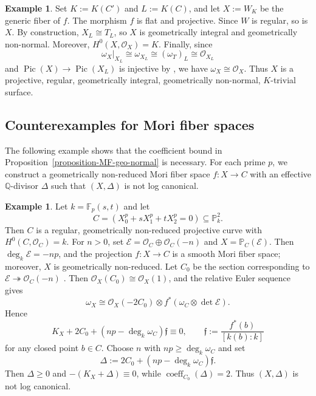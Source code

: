 \documentclass[reqno,oneside]{amsart}
\theoremstyle{definition}
\newtheorem{example}[theorem]{Example}
\theoremstyle{plain}
\numberwithin{equation}{section}
\newcommand\coeff{\operatorname{coeff}}
\begin{document}
\begin{example}
  Set $K:=K(C')$ and $L:=K(C)$, and let $X:=W_K$ be the generic fiber of $f$.
  The morphism $f$ is flat and projective. Since $W$ is regular, so is $X$.
  By construction, $X_L\cong T_L$, so $X$ is geometrically integral and geometrically non-normal.
  Moreover, $H^0(X,\mathcal O_X)=K$.
  Finally, since \[
    \omega_X|_{X_L}\cong\omega_{X_L}\cong(\omega_T)_L\cong\mathcal O_{X_L}
  \]
  and $\operatorname{Pic}(X)\to\operatorname{Pic}(X_L)$ is injective by \cite[\href{https://stacks.math.columbia.edu/tag/0CC5}{Tag~0CC5}]{stacks-project}, we have $\omega_X\cong\mathcal O_X$.
  Thus $X$ is a projective, regular, geometrically integral, geometrically non-normal, $K$-trivial surface.
\end{example}


\subsection{Counterexamples for Mori fiber spaces}\label{subsection-exam-MF-hypotheses}%
The following example shows that the coefficient bound in Proposition~\ref{proposition-MF-geo-normal} is necessary.
For each prime $p$, we construct a geometrically non-reduced Mori fiber space $f\colon X\to C$ with an effective $\mathbb Q$-divisor $\Delta$ such that $(X,\Delta)$ is not log canonical.
\begin{example}\label{example-pair}
  Let $k=\mathbb F_p(s,t)$ and let \[
    C=(X_0^p+sX_1^p+tX_2^p=0)\subseteq\mathbb P^2_k.
  \]
  Then $C$ is a regular, geometrically non-reduced projective curve with $H^0(C,\mathcal O_C)=k$.
  For $n>0$, set $\mathcal E=\mathcal O_C\oplus\mathcal O_C(-n)$ and $X=\mathbb P_C(\mathcal E)$.
  Then $\deg_k\mathcal E=-np$, and the projection $f\colon X\to C$ is a smooth Mori fiber space;
  moreover, $X$ is geometrically non-reduced.
  Let $C_0$ be the section corresponding to $\mathcal E\twoheadrightarrow\mathcal O_C(-n)$ \cite[Proposition~II.7.12]{Hartshorne-AG}.
  Then $\mathcal O_X(C_0)\cong\mathcal O_X(1)$, and the relative Euler sequence gives \[
    \omega_X\cong \mathcal O_X(-2C_0)\otimes f^*(\omega_C\otimes\det\mathcal E).
  \]
  Hence \[
    K_X+2C_0+(np-\deg_k\omega_C)\mathfrak f\equiv0, \qquad
    \mathfrak f:=\frac{f^*(b)}{[k(b):k]}
  \]
  for any closed point $b\in C$.
  Choose $n$ with $np\ge\deg_k\omega_C$ and set \[
    \Delta:=2C_0+(np-\deg_k\omega_C)\mathfrak f.
  \]
  Then $\Delta\ge0$ and $-(K_X+\Delta)\equiv0$, while $\coeff_{C_0}(\Delta)=2$.
  Thus $(X,\Delta)$ is not log canonical.
\end{example}
\end{document}
